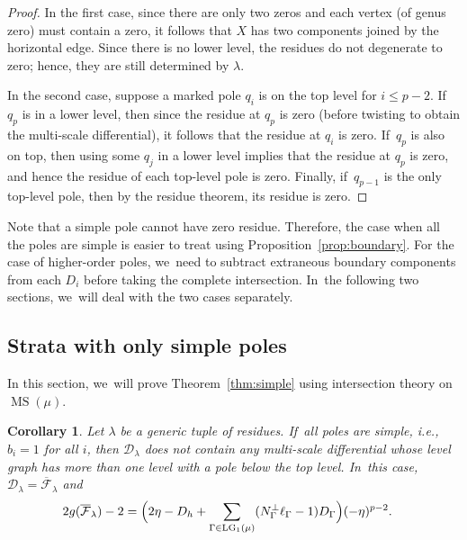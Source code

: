 \documentclass[11pt]{article}
\newcommand{\ie}{i.e.,\xspace}
\DeclareMathOperator\LG{LG}
\DeclareMathOperator\MS{MS}
\newtheorem{cor}[thm]{Corollary}
\theoremstyle{definition}
\begin{document}
\begin{proof}
In the first case, since there are only two zeros and each vertex (of genus zero) must contain a zero, it follows that $X$ has two components joined by the horizontal edge. Since there is no lower level, the residues do not degenerate to zero; hence, they are still determined by $\lambda$.

In the second case, suppose a marked pole $q_i$ is on the top level for $i\leq p-2$. If~$q_p$ is in a lower level, then since the residue at $q_p$ is zero (before twisting to obtain the multi-scale differential), it follows that the residue at $q_i$ is zero. If~$q_p$ is also on top, then using some $q_j$ in a lower level implies that the residue at $q_p$ is zero, and hence the residue of each top-level pole is zero. Finally, if~$q_{p-1}$ is the only top-level pole, then by the residue theorem, its residue is zero.
\end{proof}

Note that a simple pole cannot have zero residue. Therefore, the case when all the poles are simple is easier to treat using Proposition~\ref{prop:boundary}. For the case of higher-order poles, we~need to subtract extraneous boundary components from each $D_i$ before taking the complete intersection. In~the following two sections, we~will deal with the two cases separately.

\subsection{Strata with only simple poles}
\label{sec:simple}

In this section, we~will prove Theorem~\ref{thm:simple} using intersection theory on $\MS(\mu)$.

\begin{cor}
\label{cor:boundary-simple}
Let $\lambda$ be a generic tuple of residues. If~all poles are simple, \ie $b_i = 1$ for all $i$, then $\mathcal D_\lambda $ does not contain any multi-scale differential whose level graph has more than one level with a pole below the top level. In~this case, $\mathcal D_\lambda = \overline{\mathcal F}_\lambda$ and
\begin{align}
\label{eq:simple}
2g (\overline{\mathcal F}_\lambda) - 2 & = \Bigl( 2\eta - D_h + \sum_{\Gamma\in \LG_1(\mu)} (N_{\Gamma}^{\bot} \ell_\Gamma - 1) D_\Gamma \Bigr) (-\eta)^{p-2}.
\end{align}
\end{cor}
\end{document}
